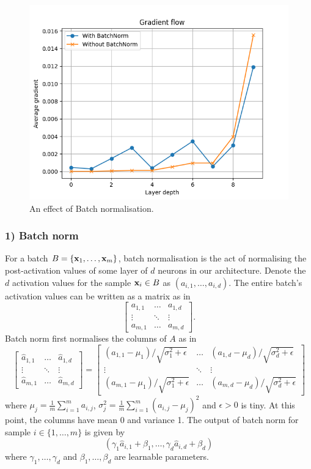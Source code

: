 \documentclass[11pt]{article}
\begin{document}
\begin{figure}[t]
    \centering
    \includegraphics[width=\columnwidth]{./figures/gradient_descent/batch_norm.png}
    \caption{An effect of Batch normalisation. }
    \label{fig:batch_norm}
\end{figure}

\subsubsection*{1) Batch norm}
For a batch $B=\{\mathbf{x}_1,\dots,\mathbf{x}_m\}$, batch normalisation is the act of normalising the post-activation values of some layer of $d$ neurons in our architecture. Denote the $d$ activation values for the sample $\mathbf{x}_i\in B$ as $(a_{i,1},\dots,a_{i,d})$. The entire batch's activation values can be written as a matrix as in
$$
\begin{bmatrix}
    a_{1,1} & \dots  & a_{1,d}\\
    \vdots  & \ddots & \vdots \\
    a_{m,1} & \dots  & a_{m,d}
\end{bmatrix}.
$$
Batch norm first normalises the columns of $A$ as in
$$
\begin{bmatrix}
    \hat{a}_{1,1} & \dots  & \hat{a}_{1,d}\\
    \vdots        & \ddots & \vdots       \\
    \hat{a}_{m,1} & \dots  & \hat{a}_{m,d}
\end{bmatrix}
=
\begin{bmatrix}
    (a_{1,1}-\mu_1) / \sqrt{\sigma_1^2+\epsilon} & \dots & (a_{1,d}-\mu_d) / \sqrt{\sigma_d^2+\epsilon}\\
    \vdots & \ddots & \vdots \\
    (a_{m,1}-\mu_1) / \sqrt{\sigma_1^2+\epsilon} & \dots & (a_{m,d}-\mu_d) / \sqrt{\sigma_d^2+\epsilon}
\end{bmatrix}
$$
where $\mu_j=\frac{1}{m}\sum_{i=1}^ma_{i,j}$, $\sigma_j^2=\frac{1}{m}\sum_{i=1}^m(a_{i,j}-\mu_j)^2$ and $\epsilon>0$ is tiny. At this point, the columns have mean 0 and variance 1. The output of batch norm for sample $i\in\{1,\dots,m\}$ is given by
$$
(\gamma_1\hat{a}_{i,1}+\beta_1,\dots,\gamma_d\hat{a}_{i,d}+\beta_d)
$$
where $\gamma_1,\dots,\gamma_d$ and $\beta_1,\dots,\beta_d$ are learnable parameters.
\end{document}
